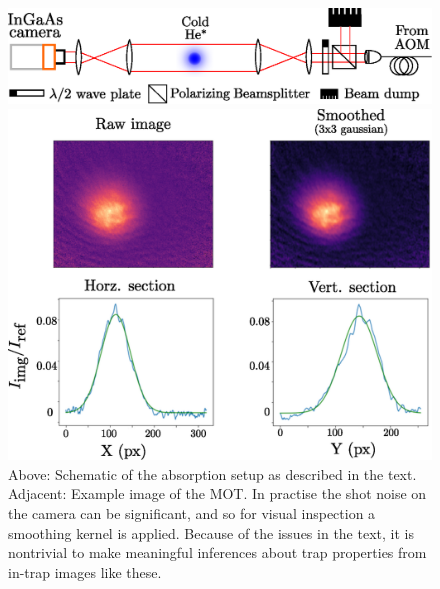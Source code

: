 	\begin{figure}
	\includegraphics[width=\textwidth]{fig/lattice/abs_img}
	\begin{minipage}{0.44\textwidth}
	\vspace{0pt}
		\caption{ Above: Schematic of the absorption setup as described in the text.
		Adjacent: 
		Example image of the MOT.
		In practise the shot noise on the camera can be significant, and so for visual inspection a smoothing kernel is applied.
		Because of the issues in the text, it is nontrivial to make meaningful inferences about trap properties from in-trap images like these.}
		\label{fig:abs_img}
		\end{minipage}
		\hfill
		\begin{minipage}{0.54\textwidth}
	    \vspace{0pt}
	    \includegraphics[width=\textwidth]{fig/lattice/20170606_CMOT_img}
	    \end{minipage}
	\end{figure}


